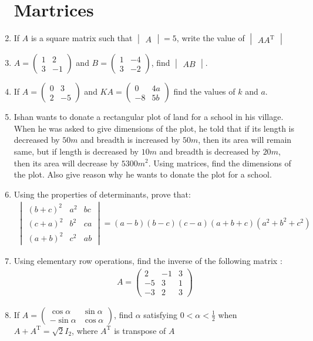 \documentclass[12pt,-letter paper]{article}
\newcommand{\myvec}[1]{\ensuremath{\begin{pmatrix}#1\end{pmatrix}}}
\newcommand{\mydet}[1]{\ensuremath{\begin{vmatrix}#1\end{vmatrix}}}
\begin{document}
\begin{enumerate}
\section{Martrices}
	\item If $A$ is a square matrix such that $\mydet{A} = 5$, write the value of 
$\mydet{AA^{\text{T}}}$

	\item $A = \myvec{1 & 2 \\ 3 & -1}$ and $B = \myvec{1 & -4 \\ 3 & -2}$, find $\mydet{AB}$.

	\item If $A = \myvec{0 & 3 \\ 2 & -5}$ and $KA = \myvec{0 & 4a \\ -8 & 5b}$ find the values of $k$ and $a$.

	\item Ishan wants to donate a rectangular plot of land for a school in his village. When he was asked to give dimensions of the plot, he told that if its length is decreased by $50m$ and breadth is increased by $50m$, then its area will remain same, but if length is decreased by $10m$ and breadth is decreased by $20m$, then its area will decrease by $5300m^2$. Using matrices, find the dimensions of the plot. Also give reason why he wants to donate the plot for a school.

	\item Using the properties of determinants, prove that:
	\begin{align}
		\mydet{(b+c)^2 & a^2 & bc \\
		(c+a)^2 & b^2 & ca\\
		(a+b)^2 & c^2 & ab} = (a - b) (b-c) (c-a) (a+b+c) (a^2 + b^2 + c^2)
	\end{align}
	
	\item Using elementary row operations, find the inverse of the following matrix :
	\begin{align}
		A = \myvec{2 & -1 & 3\\
		-5 & 3 & 1 \\
		-3 & 2 & 3}
	\end{align}



	\item If $A = \myvec{\cos \alpha & \sin \alpha\\ -\sin \alpha & \cos \alpha}$, find $\alpha$ satisfying $0<\alpha<\frac{1}{2}$ when $A + A^{\text{T}} = \sqrt{2}I_{2}$, where $A^{\text{T}}$ is transpose of $A$


\end{enumerate}
\end{document}
